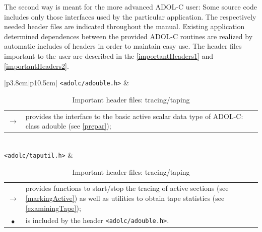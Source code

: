 \documentclass[11pt,twoside]{article}
\begin{document}
The second way is meant for the more advanced ADOL-C user: Some source code
includes only those interfaces used by the particular application. 
The respectively needed header files are indicated
throughout the manual.
Existing application determined dependences between the provided 
ADOL-C routines are realized by automatic includes of headers in order 
to maintain easy use. The header files important to the user are described
in the \autoref{importantHeaders1} and \autoref{importantHeaders2}.

\begin{table}[h]
\center \small
\begin{tabular}{|p{3.8cm}|p{10.5cm}|}\hline
\verb=<adolc/adouble.h>= & 
\begin{tabular*}{10.5cm}{cp{9.5cm}}
  \boldmath $\rightarrow$ \unboldmath
                & provides the interface to the basic active 
                  scalar data type of ADOL-C: {\sf class adouble} 
                  (see \autoref{prepar}); 
\end{tabular*}
\\ \hline
 \verb=<adolc/taputil.h>= & 
\begin{tabular*}{10.5cm}{cp{9.5cm}}
  \boldmath $\rightarrow$ \unboldmath
                & provides functions to start/stop the tracing of
                  active sections (see \autoref{markingActive})
                  as well as utilities to obtain 
                  tape statistics (see \autoref{examiningTape}); \\
  $\bullet$     & is included by the header \verb=<adolc/adouble.h>=.
\end{tabular*}
\\ \hline
\end{tabular}
\caption{Important header files: tracing/taping}
\label{importantHeaders1}
\end{table}  
\end{document}
